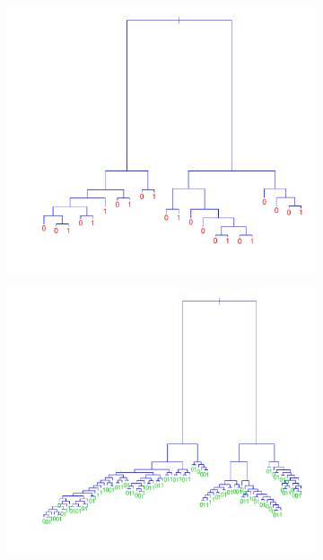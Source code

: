 \begin{figure}[h!]
  \centering
  \begin{subfigure}[b]{0.48\textwidth}
    \includegraphics[width=\textwidth]{./figures/cartSmallSpam.pdf}
  \end{subfigure}%
  \quad
  \begin{subfigure}[b]{0.48\textwidth}
    \includegraphics[width=\textwidth]{./figures/cartOptSpam.pdf}
  \end{subfigure}
  \quad

\end{figure}
